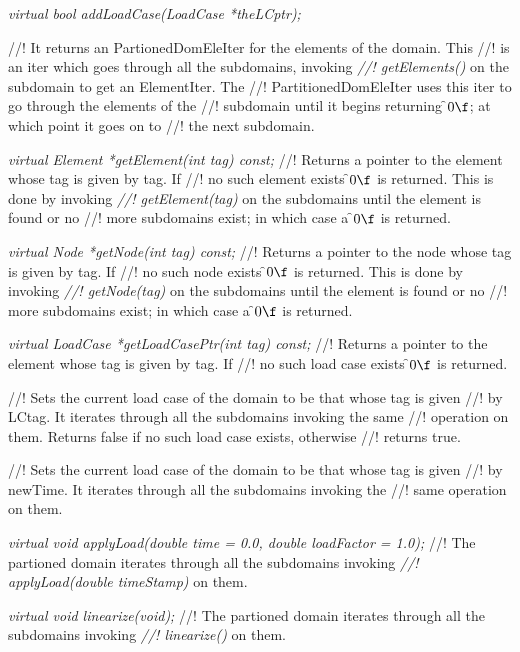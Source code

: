 {\em virtual bool addLoadCase(LoadCase *theLCptr);}


//! It returns an \p PartionedDomEleIter for the elements of the domain. This
//! is an iter which goes through all the subdomains, invoking {\em
//! getElements()} on the subdomain to get an ElementIter. The
//! PartitionedDomEleIter uses this iter to go through the elements of the
//! subdomain until it begins returning \f$0\f$; at which point it goes on to
//! the next subdomain.

{\em virtual  Element *getElement(int tag) const;}
//! Returns a pointer to the element whose tag is given by \p tag. If
//! no such element exists \f$0\f$ is returned. This is done by invoking {\em
//! getElement(tag)} on the subdomains until the element is found or no
//! more subdomains exist; in which case a \f$0\f$ is returned.

{\em virtual  Node *getNode(int tag) const;}
//! Returns a pointer to the node whose tag is given by \p tag. If
//! no such node exists \f$0\f$ is returned. This is done by invoking {\em
//! getNode(tag)} on the subdomains until the element is found or no
//! more subdomains exist; in which case a \f$0\f$ is returned.

{\em virtual  LoadCase *getLoadCasePtr(int tag) const;}
//! Returns a pointer to the element whose tag is given by \p tag. If
//! no such load case exists \f$0\f$ is returned.

//! Sets the current load case of the domain to be that whose tag is given
//! by LCtag. It iterates through all the subdomains invoking the same
//! operation on them. Returns \p false if no such load case exists, otherwise
//! returns \p true.

//! Sets the current load case of the domain to be that whose tag is given
//! by \p newTime. It iterates through all the subdomains invoking the
//! same operation on them.

{\em virtual void applyLoad(double time = 0.0, double loadFactor
= 1.0);}
//! The partioned domain iterates through all the subdomains invoking {\em
//! applyLoad(double timeStamp)} on them.

{\em virtual void linearize(void);}
//! The partioned domain iterates through all the subdomains invoking {\em
//! linearize()} on them.


